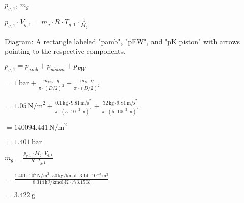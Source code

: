 \( p_{g,1} \), \( m_g \)

\( p_{g,1} \cdot V_{g,1} = m_g \cdot R \cdot T_{g,1} \cdot \frac{1}{M_g} \)

Diagram: A rectangle labeled "pamb", "pEW", and "pK piston" with arrows pointing to the respective components.

\( p_{g,1} = p_{amb} + p_{piston} + p_{EW} \)

\( = 1 \, \text{bar} + \frac{m_{EW} \cdot g}{\pi \cdot (D/2)^2} + \frac{m_K \cdot g}{\pi \cdot (D/2)^2} \)

\( = 1.05 \, \text{N/m}^2 + \frac{0.1 \, \text{kg} \cdot 9.81 \, \text{m/s}^2}{\pi \cdot (5 \cdot 10^{-2} \, \text{m})^2} + \frac{32 \, \text{kg} \cdot 9.81 \, \text{m/s}^2}{\pi \cdot (5 \cdot 10^{-2} \, \text{m})^2} \)

\( = 140094.441 \, \text{N/m}^2 \)

\( = 1.401 \, \text{bar} \)

\( m_g = \frac{p_{g,1} \cdot M_g \cdot V_{g,1}}{R \cdot T_{g,1}} \)

\( = \frac{1.401 \cdot 10^5 \, \text{N/m}^2 \cdot 50 \, \text{kg/kmol} \cdot 3.14 \cdot 10^{-3} \, \text{m}^3}{8.314 \, \text{kJ/kmol·K} \cdot 773.15 \, \text{K}} \)

\( = 3.422 \, \text{g} \)